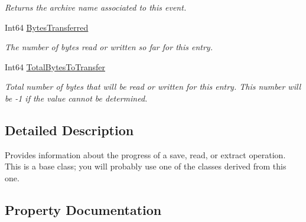 \begin{DoxyCompactItemize}
\begin{DoxyCompactList}\small\item\em Returns the archive name associated to this event. \end{DoxyCompactList}\item 
Int64 \mbox{\hyperlink{class_super_tiled2_unity_1_1_ionic_1_1_zip_1_1_zip_progress_event_args_a38659e4968d042dd43ab89570d0fee35}{Bytes\+Transferred}}
\begin{DoxyCompactList}\small\item\em The number of bytes read or written so far for this entry. \end{DoxyCompactList}\item 
Int64 \mbox{\hyperlink{class_super_tiled2_unity_1_1_ionic_1_1_zip_1_1_zip_progress_event_args_a86555bef7cd829c35b74816bb1113692}{Total\+Bytes\+To\+Transfer}}
\begin{DoxyCompactList}\small\item\em Total number of bytes that will be read or written for this entry. This number will be -\/1 if the value cannot be determined. \end{DoxyCompactList}\end{DoxyCompactItemize}


\subsection{Detailed Description}
Provides information about the progress of a save, read, or extract operation. This is a base class; you will probably use one of the classes derived from this one. 



\subsection{Property Documentation}
\mbox{\label{class_super_tiled2_unity_1_1_ionic_1_1_zip_1_1_zip_progress_event_args_a08044c6164aecbece74b2ca903694072}} 
